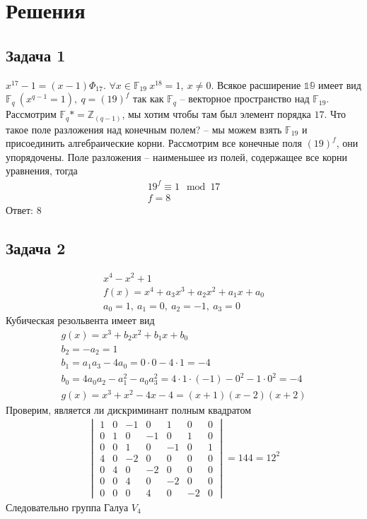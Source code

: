 
\newpage
\section*{Решения}
\subsection*{Задача 1}
	$x^{17} - 1 = (x-1) \Phi_{17}$. $\forall x \in \mathbb{F}_{19}\ x^18 = 1,\ x \ne 0$. Всякое расширение $\mathbb{19}$ имеет вид $\mathbb{F}_q\ (x^{q-1} = 1),\ q = (19)^f$ так как $\mathbb{F}_q$ -- векторное пространство над $\mathbb{F}_{19}$. Рассмотрим $\mathbb{F}_{q}* = \mathbb{Z}_{(q-1)}$, мы хотим чтобы там был элемент порядка $17$. Что такое поле разложения над конечным полем? -- мы можем взять $\mathbb{F}_19$ и присоединить алгебраические корни. Рассмотрим все конечные поля $(19)^f$, они упорядочены. Поле разложения -- наименьшее из полей, содержащее все корни уравнения, тогда
	\begin{gather*}
		19^f \equiv 1 \mod 17\\
		f = 8
	\end{gather*}
	Ответ: 8
\vskip 0.4in

\subsection*{Задача 2}
	\begin{gather*}
		x^4 - x^2 + 1\\
		f(x) = x^4 + a_3x^3 + a_2x^2 + a_1x + a_0\\
		a_0 = 1,\ a_1 = 0,\ a_2 = -1,\ a_3 = 0
	\end{gather*}
	Кубическая резольвента имеет вид
	\begin{gather*}
		g(x) = x^3 + b_2 x^2 + b_1 x + b_0\\
		b_2 = -a_2 = 1\\
		b_1 = a_1 a_3 - 4a_0 = 0 \cdot 0 - 4 \cdot 1 = -4\\
		b_0 = 4a_0 a_2 - a_1^2 - a_0 a_3^2 = 4 \cdot 1 \cdot (-1) - 0^2 - 1 \cdot 0^2 = -4\\
		g(x) = x^3 + x^2 - 4x - 4 = (x+1)(x-2)(x+2)
	\end{gather*}
	Проверим, является ли дискриминант полным квадратом
	\begin{gather*}
	\begin{vmatrix}
		1 & 0 & -1 & 0 & 1 & 0 & 0\\
		0 & 1 & 0 & -1 & 0 & 1 & 0\\
		0 & 0 & 1 & 0 & -1 & 0 & 1\\
		4 & 0 & -2 & 0 & 0 & 0 & 0\\
		0 & 4 & 0 & -2 & 0 & 0 & 0\\
		0 & 0 & 4 & 0 & -2 & 0 & 0\\
		0 & 0 & 0 & 4 & 0 & -2 & 0
	\end{vmatrix}
	= 144 = 12^2
	\end{gather*}
	Следовательно группа Галуа $V_4$

